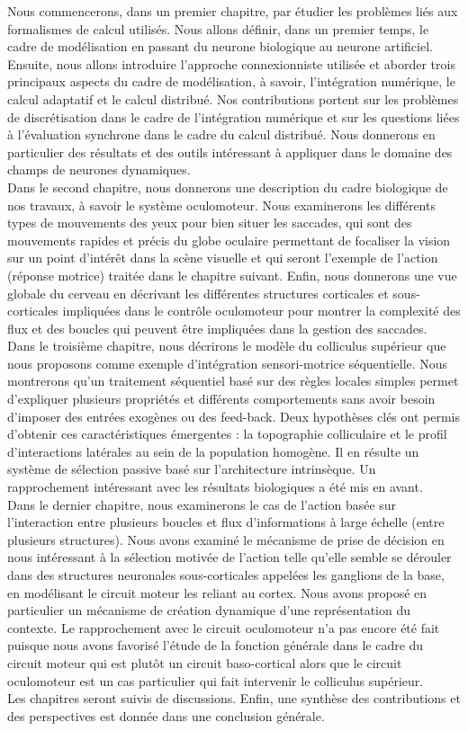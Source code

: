 Nous commencerons, dans un premier chapitre, par étudier les problèmes liés aux formalismes de calcul utilisés. Nous allons définir, dans un premier temps, le cadre de modélisation en passant du neurone biologique au neurone artificiel. Ensuite, nous allons introduire l'approche connexionniste utilisée et aborder trois principaux aspects du cadre de modélisation, à savoir, l'intégration numérique, le calcul adaptatif et le calcul distribué. Nos contributions portent sur les problèmes de discrétisation dans le cadre de l'intégration numérique et sur les questions liées à l'évaluation synchrone dans le cadre du calcul distribué. Nous donnerons en particulier des résultats et des outils intéressant à appliquer dans le domaine des champs de neurones dynamiques.\\

Dans le second chapitre, nous donnerons une description du cadre biologique de nos travaux, à savoir le système oculomoteur. Nous examinerons les différents types de mouvements des yeux pour bien situer les saccades, qui sont des mouvements rapides et précis du globe oculaire permettant de focaliser la vision sur un point d'intérêt dans la scène visuelle et qui seront l'exemple de l'action (réponse motrice) traitée dans le chapitre suivant. Enfin, nous donnerons une vue globale du cerveau en décrivant les différentes structures corticales et sous-corticales impliquées dans le contrôle oculomoteur pour montrer la complexité des flux et des boucles qui peuvent être impliquées dans la gestion des saccades.\\

Dans le troisième chapitre, nous décrirons le modèle du colliculus supérieur que nous proposons comme exemple d'intégration sensori-motrice séquentielle. Nous montrerons qu'un traitement séquentiel basé sur des règles locales simples permet d'expliquer plusieurs propriétés et différents comportements sans avoir besoin d'imposer des entrées exogènes ou des feed-back. Deux hypothèses clés ont permis d'obtenir ces caractéristiques émergentes : la topographie colliculaire et le profil d'interactions latérales au sein de la population homogène. Il en résulte un système de sélection passive basé sur l'architecture intrinsèque. Un rapprochement intéressant avec les résultats biologiques a été mis en avant.\\

Dans le dernier chapitre, nous examinerons le cas de l'action basée sur l'interaction entre plusieurs boucles et flux d'informations à large échelle (entre plusieurs structures). Nous avons examiné le mécanisme de prise de décision en nous intéressant à la sélection motivée de l'action telle qu'elle semble se dérouler dans des structures neuronales sous-corticales appelées les ganglions de la base, en modélisant le circuit moteur les reliant au cortex. Nous avons proposé en particulier un mécanisme de création dynamique d'une représentation du contexte. Le rapprochement avec le circuit oculomoteur n'a pas encore été fait puisque nous avons favorisé l'étude de la fonction générale dans le cadre du circuit moteur qui est plutôt un circuit baso-cortical alors que le circuit oculomoteur est un cas particulier qui fait intervenir le colliculus supérieur. \\

Les chapitres seront suivis de discussions. Enfin, une synthèse des contributions et des perspectives est donnée dans une conclusion générale. \\

 
